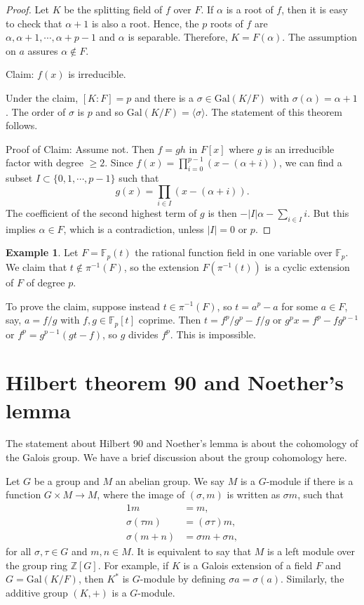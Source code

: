 \documentclass[12pt]{report}
\theoremstyle{definition}
\newtheorem{example}[thm]{Example}
\def\ZZ{\mathbb{Z}}
\def\FF{\mathbb{F}}
\def\aa{\alpha}
\def\Gal{\text{Gal}}
\def\gm{$G$-module}
\begin{document}
\begin{proof}
    Let $K$ be the splitting field of $f$ over $F$. If $\aa$ is a root of $f$, then it is easy to check that $\aa+1$ is also a root. Hence, the $p$ roots of $f$ are $\aa,\aa+1,\cdots,\aa+p-1$ and $\aa$ is separable. Therefore, $K=F(\aa)$. The assumption on $a$ assures $\aa\notin F$.

    Claim: $f(x)$ is irreducible.

    Under the claim, $[K:F]=p$ and there is a $\sigma\in \Gal(K/F)$ with $\sigma(\aa)=\aa+1$. The order of $\sigma$ is $p$ and so $\Gal(K/F)=\langle \sigma\rangle$. The statement of this theorem follows.

    Proof of Claim: Assume not. Then $f=gh$ in $F[x]$ where $g$ is an irreducible factor with degree $\geq 2$. Since $f(x)=\prod_{i=0}^{p-1}(x-(\aa+i))$, we can find a subset $I\subset\{0,1,\cdots,p-1\}$ such that $$g(x)=\prod_{i\in I}(x-(\aa+i)).$$ The coefficient of the second highest term of $g$ is then $-|I|\aa-\sum_{i\in I}i$. But this implies $\aa\in F$, which is a contradiction, unless $|I|=0$ or $p$. 
\end{proof}

\begin{example}
    Let $F=\FF_p(t)$ the rational function field in one variable over $\FF_p$. We claim that $t\notin \pi^{-1}(F)$, so the extension $F(\pi^{-1}(t))$ is a cyclic extension of $F$ of degree $p$.

    To prove the claim, suppose instead $t\in \pi^{-1}(F)$, so $t=a^p-a$ for some $a\in F$, say, $a=f/g$ with $f,g\in \FF_p[t]$ coprime. Then $t=f^p/g^p-f/g$ or $g^px=f^p-fg^{p-1}$ or $f^p=g^{p-1}(gt-f)$, so $g$ divides $f^p$. This is impossible.
\end{example}

\section{Hilbert theorem 90 and Noether's lemma}

The statement about Hilbert 90 and Noether's lemma is about the cohomology of the Galois group. We have a brief discussion about the group cohomology here.

Let $G$ be a group and $M$ an abelian group. We say $M$ is a $G$-module if there is a function $G\times M\to M$, where the image of $(\sigma,m)$ is written as $\sigma m$, such that \begin{align*}
    1m &= m,\\
    \sigma(\tau m)&=(\sigma\tau)m,\\
    \sigma(m+n)&=\sigma m +\sigma n,
\end{align*}
for all $\sigma,\tau\in G$ and $m,n\in M$. It is equivalent to say that $M$ is a left module over the group ring $\ZZ[G]$. For example, if $K$ is a Galois extension of a field $F$ and $G=\Gal(K/F)$, then $K^*$ is $G$-module by defining $\sigma a=\sigma(a)$. Similarly, the additive group $(K,+)$ is a \gm. 
\end{document}
